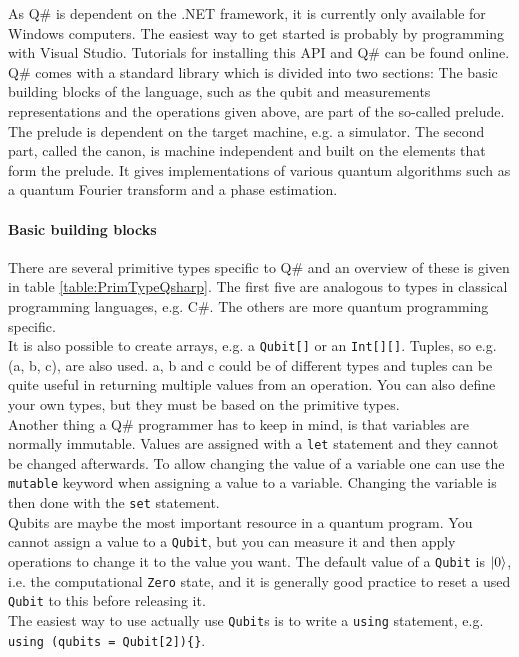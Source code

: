 As Q\# is dependent on the .NET framework, it is currently only available for Windows computers. The easiest way to get started is probably by programming with Visual Studio. Tutorials for installing this API and Q\# can be found online. \\
Q\# comes with a standard library which is divided into two sections: The basic building blocks of the language, such as the qubit and measurements representations and the operations given above, are part of the so-called prelude. The prelude is dependent on the target machine, e.g. a simulator.  The second part, called the canon, is machine independent and built on the elements that form the prelude. It gives implementations of various quantum algorithms such as a quantum Fourier transform and a phase estimation.  

\paragraph{Basic building blocks} There are several primitive types specific to Q\# and an overview of these is given in table \ref{table:PrimTypeQsharp}. The first five are analogous to types in classical programming languages, e.g. C\#. The others are more quantum programming specific. \\
It is also possible to create arrays, e.g. a \texttt{Qubit[]} or an \texttt{Int[][]}. Tuples, so e.g. (a, b, c), are also used. a, b and c could be of different types and tuples can be quite useful in returning multiple values from an operation. You can also define your own types, but they must be based on the primitive types.\\
Another thing a Q\# programmer has to keep in mind, is that variables are normally immutable. Values are assigned with a \texttt{let} statement and they cannot be changed afterwards. To allow changing the value of a variable one can use the \texttt{mutable} keyword when assigning a value to a variable. Changing the variable is then done with the \texttt{set} statement.\\
Qubits are maybe the most important resource in a quantum program. You cannot assign a value to a \texttt{Qubit}, but you can measure it and then apply operations to change it to the value you want. The default value of a \texttt{Qubit} is $\left\vert{0}\right\rangle$, i.e. the computational \texttt{Zero} state, and it is generally good practice to reset a used \texttt{Qubit} to this before releasing it.\\
The easiest way to use actually use \texttt{Qubit}s is to write a \texttt{using} statement, e.g. \texttt{using (qubits = Qubit[2])\{<any code using these qubits>\}}.

